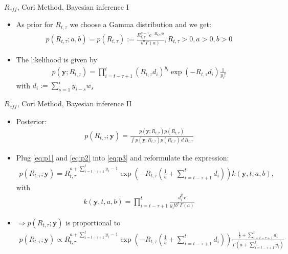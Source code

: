 \documentclass[
  ignorenonframetext,
  aspectratio=169,
]{beamer}
\newcommand{\mli}[1]{\mathit{#1}}%
\begin{document}
\begin{frame}{\(R_\mli{eff}\), Cori Method,
Bayesian inference I}
\protect\hypertarget{r_mlieff-cori-method-bayesian-inference-i}{}
\begin{itemize}
\item As prior for $R_{t,\tau}$ we choose a Gamma distribution and we get:
\begin{align}
  p(R_{t,\tau};a,b)=p(R_{t,\tau}):=\frac{R_{t,\tau}^{a-1}e^{-R_{t,\tau}/b}}{b^a\Gamma(a)}, R_{t,\tau}>0, a>0, b>0 \label{eq:p1}
\end{align}
\item The likelihood is given by
\begin{align}
  p(\boldsymbol{y};R_{t,\tau}) = \prod_{i=t-\tau+1}^t (R_{t,\tau} d_i)^{y_i} \exp\left(-R_{t,\tau} d_i\right)\frac{1}{y_i!} \label{eq:p2}
\end{align}
with $d_i:=\sum_{s=1}^i y_{i-s}w_s$
\end{itemize}
\end{frame}

\begin{frame}{\(R_\mli{eff}\), Cori Method,
Bayesian inference II}
\protect\hypertarget{r_mlieff-cori-method-bayesian-inference-ii}{}
\begin{itemize}
\item Posterior:
\begin{align}
  p(R_{t,\tau};\boldsymbol{y}) = \frac{p(\boldsymbol{y};R_{t,\tau})p(R_{t,\tau})}{\int p(\boldsymbol{y};R_{t,\tau})p(R_{t,\tau})\, d\, R_{t,\tau}} \label{eq:p3}
\end{align}
\item Plug \eqref{eq:p1} and \eqref{eq:p2} into \eqref{eq:p3} and reformulate the expression:
\begin{align*}
  p(R_{t,\tau};\boldsymbol{y}) = R_{t,\tau}^{a+\sum_{i=t-\tau+1}^t y_i - 1} \exp\left(-R_{t,\tau}\left(\frac{1}{b} + \sum_{i=t-\tau+1}^t d_i \right)\right) k(\boldsymbol{y},t,a,b),
\end{align*}
with
\begin{align*}
k(\boldsymbol{y},t,a,b) = \prod_{i=t-\tau+1}^t \frac{d_i^{y_i} c}{y_i! b^a \Gamma(a)}
\end{align*}
\item $\Rightarrow p(R_{t,\tau};\boldsymbol{y})$ is proportional to
\begin{align*}
  p(R_{t,\tau};\boldsymbol{y}) \propto R_{t,\tau}^{a+\sum_{i=t-\tau+1}^t y_i - 1} \exp\left(-R_{t,\tau}\left(\frac{1}{b} + \sum_{i=t-\tau+1}^t d_i \right)\right) \frac{\frac{1}{b}+\sum_{i=t-\tau+1}^t d_i}{\Gamma(a+\sum_{i=t-\tau+1}^t y_i)}
\end{align*}
\end{itemize}
\end{frame}
\end{document}
